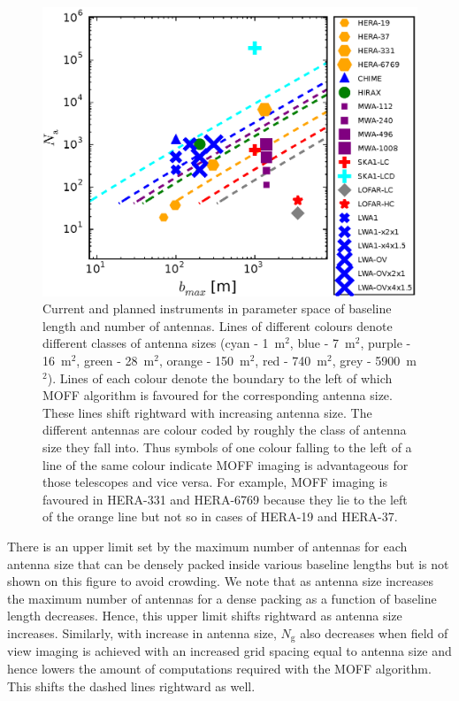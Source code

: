 \documentclass[a4paper,fleqn,usenatbib]{mnras}
\newcommand{\Ngrid}{N_\textrm{g}}
\begin{document}
\begin{figure}
  \includegraphics[width=\columnwidth]{figure12}
  \caption{Current and planned instruments in parameter space of baseline length and number of antennas. Lines of different colours denote different classes of antenna sizes (cyan - 1~m$^2$, blue - 7~m$^2$, purple - 16~m$^2$, green - 28~m$^2$, orange - 150~m$^2$, red - 740~m$^2$, grey - 5900~m$^2$). Lines of each colour denote the boundary to the left of which MOFF algorithm is favoured for the corresponding antenna size. These lines shift rightward with increasing antenna size. The different antennas are colour coded by roughly the class of antenna size they fall into. Thus symbols of one colour falling to the left of a line of the same colour indicate MOFF imaging is advantageous for those telescopes and vice versa. For example, MOFF imaging is favoured in HERA-331 and HERA-6769 because they lie to the left of the orange line but not so in cases of HERA-19 and HERA-37.}
  \label{fig:parameter-space-bll-nant-instruments}
\end{figure}

There is an upper limit set by the maximum number of antennas for each antenna size that can be densely packed inside various baseline lengths but is not shown on this figure to avoid crowding. We note that as antenna size increases the maximum number of antennas for a dense packing as a function of baseline length decreases. Hence, this upper limit shifts rightward as antenna size increases. Similarly, with increase in antenna size, $\Ngrid$ also decreases when field of view imaging is achieved with an increased grid spacing equal to antenna size and hence lowers the amount of computations required with the MOFF algorithm. This shifts the dashed lines rightward as well.
\end{document}

